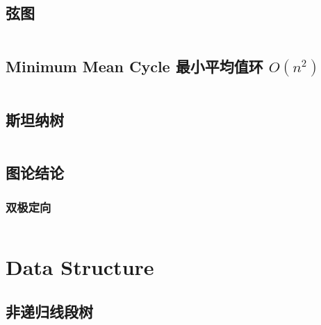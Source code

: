 \documentclass[titlepage, a4paper]{article}
\begin{document}
\begin{multicols}{2}
\begin{spacing}{0.6}
				\subsection{弦图}
					
					\inputminted{cpp}{src/TreeandGraph/弦图.cpp}
				\subsection{Minimum Mean Cycle 最小平均值环 $O(n^2)$}
					\inputminted{cpp}{src/TreeandGraph/MeanCycle.cpp}
				\subsection{斯坦纳树}
					\inputminted{cpp}{src/TreeandGraph/斯坦纳树.cpp}
				\subsection{图论结论}
					
					
					
					
					
					
					\subsubsection{双极定向}
					\inputminted{cpp}{src/tbr/bipolar_orientation.cpp}
					

			\section{Data Structure}
				\subsection{非递归线段树}

\end{spacing}
\end{multicols}
\end{document}
